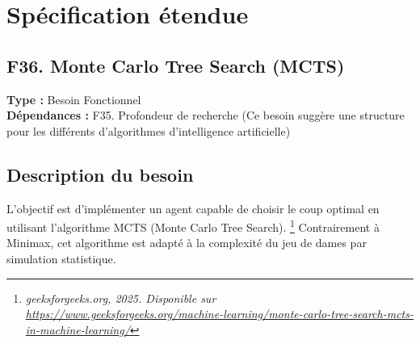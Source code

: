 \documentclass[11pt,a4paper]{article}
\begin{document}
\section{Spécification étendue}

\subsection*{F36. Monte Carlo Tree Search (MCTS)}

\noindent \textbf{Type :} Besoin Fonctionnel \\
\textbf{Dépendances :} F35. Profondeur de recherche (Ce besoin suggère une structure pour les différents d'algorithmes d'intelligence artificielle)

\subsection{Description du besoin}
L'objectif est d'implémenter un agent capable de choisir le coup optimal en utilisant l'algorithme MCTS (Monte Carlo Tree Search). \footnote{\textit{geeksforgeeks.org, 2025. Disponible sur \url{https://www.geeksforgeeks.org/machine-learning/monte-carlo-tree-search-mcts-in-machine-learning/}}} Contrairement à Minimax, cet algorithme est adapté à la complexité du jeu de dames par simulation statistique.
\end{document}
